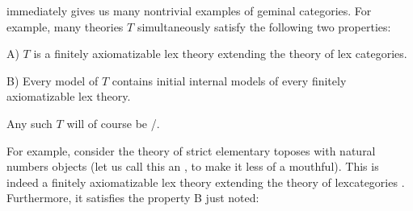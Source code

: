  immediately gives us many nontrivial examples of geminal categories. For example, many theories $T$ simultaneously satisfy the following two properties:

A) $T$ is a finitely axiomatizable lex theory extending the theory of lex categories.

B) Every model of $T$ contains initial internal models of every finitely axiomatizable lex theory.

Any such $T$ will of course be \initogeminal/.

For example, consider the theory of strict elementary toposes with natural numbers objects (let us call this an , to make it less of a mouthful). This is indeed a finitely axiomatizable lex theory extending the theory of lexcategories . Furthermore, it satisfies the property B just noted:

